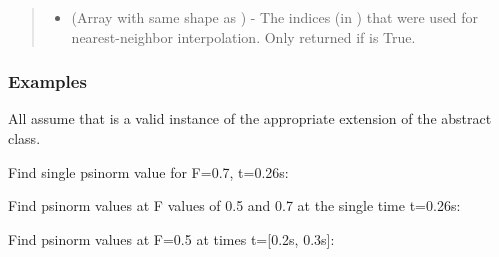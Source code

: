 \documentclass[letterpaper,10pt,english]{sphinxmanual}
\begin{document}
\begin{fulllineitems}
\begin{fulllineitems}
\begin{quote}
\begin{description}
\begin{itemize}
\item {} 
 (Array with same shape as ) - The indices
(in ) that were used for
nearest-neighbor interpolation. Only returned if  is
True.

\end{itemize}


\end{description}\end{quote}
\subsubsection*{Examples}

All assume that  is a valid instance of the appropriate
extension of the {\hyperref[\detokenize{eqtools:eqtools.core.Equilibrium}]{}} abstract class.

Find single psinorm value for F=0.7, t=0.26s:

\begin{sphinxVerbatim}[commandchars=\\\{\}]
   
\end{sphinxVerbatim}

Find psinorm values at F values of 0.5 and 0.7 at the single time
t=0.26s:

\begin{sphinxVerbatim}[commandchars=\\\{\}]
  \PYG{p}{[} \PYG{p}{]} 
\end{sphinxVerbatim}

Find psinorm values at F=0.5 at times t={[}0.2s, 0.3s{]}:

\begin{sphinxVerbatim}[commandchars=\\\{\}]
   \PYG{p}{[} \PYG{p}{]}
\end{sphinxVerbatim}


\end{fulllineitems}
\end{fulllineitems}
\end{document}
